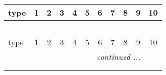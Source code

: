 \documentclass[fleqn,9pt,landscape]{jsarticle}
\begin{document}
\begin{center}
\renewcommand{\arraystretch}{1.3}
\begin{longtable}{lcccccccccc}
 \hline \hline
type & 1 & 2 & 3 & 4 & 5 & 6 & 7 & 8 & 9 & 10 \\ \hline \endfirsthead

\multicolumn{10}{l}{\tablename\ \thetable{}} \\
 \hline \hline
type & 1 & 2 & 3 & 4 & 5 & 6 & 7 & 8 & 9 & 10 \\ \hline \endhead

 \hline \hline
\multicolumn{10}{r}{\footnotesize\it continued ...} \\ \endfoot

 \hline \hline
\multicolumn{10}{r}{} \\ \endlastfoot


\end{longtable}
\end{center}
\end{document}
